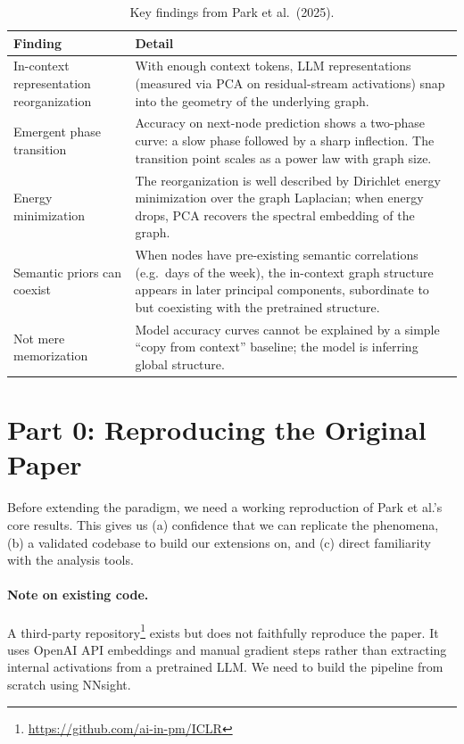 \documentclass[11pt]{article}
\begin{document}
\begin{table}[h]
\centering
\renewcommand{\arraystretch}{1.4}
\begin{tabular}{@{}p{4.5cm}p{10cm}@{}}
\toprule
\textbf{Finding} & \textbf{Detail} \\
\midrule
In-context representation reorganization & With enough context tokens, LLM representations (measured via PCA on residual-stream activations) snap into the geometry of the underlying graph. \\
Emergent phase transition & Accuracy on next-node prediction shows a two-phase curve: a slow phase followed by a sharp inflection. The transition point scales as a power law with graph size. \\
Energy minimization & The reorganization is well described by Dirichlet energy minimization over the graph Laplacian; when energy drops, PCA recovers the spectral embedding of the graph. \\
Semantic priors can coexist & When nodes have pre-existing semantic correlations (e.g.\ days of the week), the in-context graph structure appears in later principal components, subordinate to but coexisting with the pretrained structure. \\
Not mere memorization & Model accuracy curves cannot be explained by a simple ``copy from context'' baseline; the model is inferring global structure. \\
\bottomrule
\end{tabular}
\caption{Key findings from Park et al.\ (2025).}
\label{tab:background}
\end{table}

\section{Part 0: Reproducing the Original Paper}
\label{sec:reproduction}

Before extending the paradigm, we need a working reproduction of Park et al.'s core results. This gives us (a) confidence that we can replicate the phenomena, (b) a validated codebase to build our extensions on, and (c) direct familiarity with the analysis tools.

\paragraph{Note on existing code.} A third-party repository\footnote{\url{https://github.com/ai-in-pm/ICLR}} exists but does not faithfully reproduce the paper. It uses OpenAI API embeddings and manual gradient steps rather than extracting internal activations from a pretrained LLM. We need to build the pipeline from scratch using NNsight.
\end{document}
